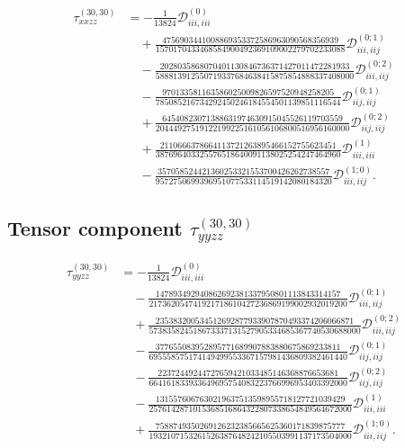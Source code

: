 \documentclass[aip,jcp,reprint]{revtex4-2}
\begin{document}
\begin{widetext}
\begin{equation}
\begin{aligned}
\tau^{(30,30)}_{xxzz} &=
-\frac{1}{13824}\mathcal{D}^{(0)}_{iii,iii}
\\
&\quad
+ \frac{4756903441008869353372586963090568356939}
       {1570170433468584900492369109002279702233088}
  \mathcal{D}^{(0;1)}_{iii,iij}
\\
&\quad
- \frac{2028035868070401130846736371427011472281933}
       {588813912550719337684638415875854888337408000}
  \mathcal{D}^{(0;2)}_{iii,iij}
\\
&\quad
- \frac{970133581163586025009826597520948258205}
       {785085216734292450246184554501139851116544}
  \mathcal{D}^{(0;1)}_{iij,iij}
\\
&\quad
+ \frac{64540823071388631974630915045526119703559}
       {20444927519122199225161056106800516956160000}
  \mathcal{D}^{(0;2)}_{iij,iij}
\\
&\quad
+ \frac{2110666378664113721263895466152755623451}
       {387696403325576518640091138025254247464960}
  \mathcal{D}^{(1)}_{iii,iii}
\\
&\quad
- \frac{357058524421360253321553700426262738557}
       {9572750699396951077533114519142080184320}
  \mathcal{D}^{(1;0)}_{iii,iij}.
\end{aligned}
\end{equation}

\subsection{Tensor component $\tau^{(30,30)}_{yyzz}$}

\begin{equation}
\begin{aligned}
\tau^{(30,30)}_{yyzz} &=
-\frac{1}{13824}\mathcal{D}^{(0)}_{iii,iii}
\\
&\quad
- \frac{147893492940862692381337950801113843314157}
       {217362054741921718610427236869199002932019200}
  \mathcal{D}^{(0;1)}_{iii,iij}
\\
&\quad
+ \frac{235383200534512692877933907870493374206066871}
       {573835824518673337131527905334685367740530688000}
  \mathcal{D}^{(0;2)}_{iii,iij}
\\
&\quad
- \frac{377655083952895771689907883880675869233811}
       {695558575174149499553367157981436809382461440}
  \mathcal{D}^{(0;1)}_{iij,iij}
\\
&\quad
- \frac{22372449244727659421033485146368876653681}
       {664161833933649695754083223766996953403392000}
  \mathcal{D}^{(0;2)}_{iij,iij}
\\
&\quad
- \frac{1315576067630219637513598955718127721039429}
       {2576142871015368516864322807338654849564672000}
  \mathcal{D}^{(1)}_{iii,iii}
\\
&\quad
+ \frac{7588749350269126232385665625360171839875777}
       {1932107153261526387648242105503991137173504000}
  \mathcal{D}^{(1;0)}_{iii,iij}.
\end{aligned}
\end{equation}


\end{widetext}
\end{document}
